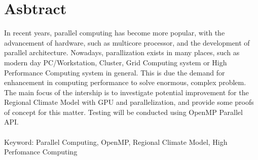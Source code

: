 \chapter*{Asbtract}

In recent years, parallel computing has become more popular, with the advancement of hardware, such as multicore processor, and the development of parallel architecture. Nowadays, parallization exists in many places, such as modern day PC/Workstation, Cluster, Grid Computing system or High Performance Computing system in general. This is due the demand for enhancement in computing performance to solve enormous, complex problem. \\
The main focus of the intership is to investigate potential improvement for the Regional Climate Model with GPU and parallelization, and provide some proofs of concept for this matter. Testing will be conducted using OpenMP Parallel API.\\
~\\
Keyword: Parallel Computing, OpenMP, Regional Climate Model, High Perfomance Computing